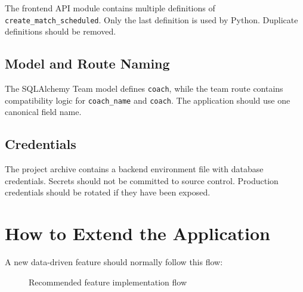 \documentclass[11pt,a4paper]{article}
\begin{document}
The frontend API module contains multiple definitions of
\texttt{create\_match\_scheduled}. Only the last definition is used by
Python. Duplicate definitions should be removed.

\subsection{Model and Route Naming}

The SQLAlchemy Team model defines \texttt{coach}, while the team route
contains compatibility logic for \texttt{coach\_name} and
\texttt{coach}. The application should use one canonical field name.

\subsection{Credentials}

The project archive contains a backend environment file with database
credentials. Secrets should not be committed to source control.
Production credentials should be rotated if they have been exposed.

\section{How to Extend the Application}

A new data-driven feature should normally follow this flow:

\begin{figure}[H]
\centering
{}
\caption{Recommended feature implementation flow}
\end{figure}
\end{document}
